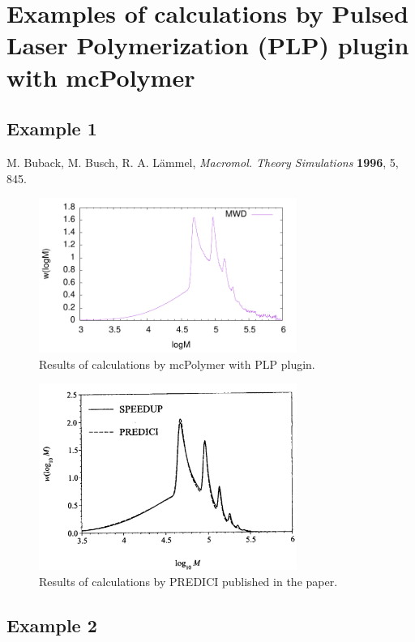 \documentclass{article}
\begin{document}
\section*{Examples of calculations by Pulsed Laser Polymerization (PLP) plugin with mcPolymer}

\subsection*{Example 1}


M. Buback, M. Busch, R. A. Lämmel, \textit{Macromol. Theory Simulations} \textbf{1996}, 5, 845.

\begin{figure}[h]
\centering
\includegraphics[width=0.75\textwidth]{plp_example1.pdf}
\caption{Results of calculations by mcPolymer with PLP plugin.}
\end{figure}

\begin{figure}[h]
\centering
\includegraphics[width=0.75\textwidth]{Buback1996_PLP.png}
\caption{Results of calculations by PREDICI published in the paper.}
\end{figure}

\subsection*{Example 2}
\end{document}
